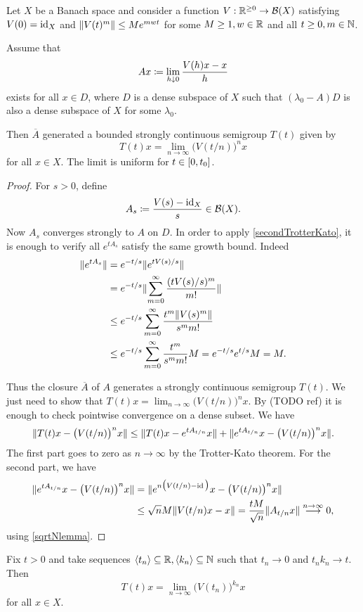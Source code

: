 \begin{theorem}
Let $X$ be a Banach space and consider a function $V: \mathbb{R}^{\geq 0}\to \operatorname{\mathcal{B}}(X)$ satisfying $V(0) = \operatorname{id}_X$ and $\lVert V(t)^m\rVert\leq Me^{mwt}$ for some $M\geq 1, w\in\mathbb{R}$ and all $t\geq 0, m\in \mathbb{N}$.

Assume that
\[ Ax \coloneqq \lim_{h\downarrow 0}\frac{V(h)x-x}{h} \]
exists for all $x\in D$, where $D$ is a dense subspace of $X$ such that $(\lambda_0 - A)D$ is also a dense subspace of $X$ for some $\lambda_0$.

Then $\overline{A}$ generated a bounded strongly continuous semigroup $T(t)$ given by
\[ T(t)x = \lim_{n\to \infty}\big(V(t/n)\big)^n x \]
for all $x\in X$. The limit is uniform for $t\in\interval{0,t_0}$.
\end{theorem}
\begin{proof}
For $s> 0$, define
\[ A_s \coloneqq \frac{V(s)-\operatorname{id}_X}{s} \in \operatorname{\mathcal{B}}(X). \]
Now $A_s$ converges strongly to $A$ on $D$. In order to apply \ref{secondTrotterKato}, it is enough to verify all $e^{tA_s}$ satisfy the same growth bound. Indeed
\begin{align*}
\lVert e^{tA_s}\rVert &= e^{-t/s}\lVert e^{tV(s)/s}\rVert \\
&= e^{-t/s}\lVert\sum_{m=0}^\infty \frac{(tV(s)/s)^m}{m!}\rVert \\
&\leq  e^{-t/s}\sum_{m=0}^\infty \frac{t^m\lVert V(s)^m\rVert}{s^mm!} \\
&\leq e^{-t/s}\sum_{m=0}^\infty \frac{t^m}{s^mm!}M = e^{-t/s}e^{t/s}M = M.
\end{align*}

Thus the closure $\overline{A}$ of $A$ generates a strongly continuous semigroup $T(t)$. We just need to show that $T(t)x = \lim_{n\to \infty}\big(V(t/n)\big)^n x$. By (TODO ref) it is enough to check pointwise convergence on a dense subset. We have
\[ \lVert T(t)x - \big(V(t/n)\big)^n x\rVert \leq \lVert T(t)x - e^{tA_{t/n}} x\rVert + \lVert e^{tA_{t/n}} x - \big(V(t/n)\big)^n x\rVert. \]
The first part goes to zero as $n\to \infty$ by the Trotter-Kato theorem. For the second part, we have
\begin{align*}
\lVert e^{tA_{t/n}} x - \big(V(t/n)\big)^n x\rVert &= \lVert e^{n\big(V(t/n)-\operatorname{id}\big)}x - \big(V(t/n)\big)^n x\rVert \\
&\leq \sqrt{n}M \lVert V(t/n)x-x\rVert = \frac{tM}{\sqrt{n}}\lVert A_{t/n}x\rVert \overset{n\to\infty}{\longrightarrow}0,
\end{align*}
using \ref{sqrtNlemma}.
\end{proof}
\begin{corollary}
Fix $t >0$ and take sequences $\left\langle t_n \right\rangle\subseteq \mathbb{R}, \left\langle k_n \right\rangle\subseteq \mathbb{N}$ such that $t_n \to 0$ and $t_nk_n \to t$. Then
\[ T(t)x = \lim_{n\to \infty}\big(V(t_n)\big)^{k_n} x \]
for all $x\in X$.
\end{corollary}
